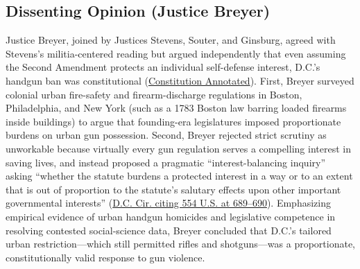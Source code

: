 \documentclass[12pt]{article}
\begin{document}
\subsection{Dissenting Opinion (Justice Breyer)}
Justice Breyer, joined by Justices Stevens, Souter, and Ginsburg, agreed with Stevens's militia-centered reading but argued independently that even assuming the Second Amendment protects an individual self-defense interest, D.C.'s handgun ban was constitutional (\href{https://www.law.cornell.edu/constitution-conan/amendment-2/the-heller-decision-and-individual-right-to-firearms}{Constitution Annotated}). First, Breyer surveyed colonial urban fire-safety and firearm-discharge regulations in Boston, Philadelphia, and New York (such as a 1783 Boston law barring loaded firearms inside buildings) to argue that founding-era legislatures imposed proportionate burdens on urban gun possession. Second, Breyer rejected strict scrutiny as unworkable because virtually every gun regulation serves a compelling interest in saving lives, and instead proposed a pragmatic ``interest-balancing inquiry'' asking ``whether the statute burdens a protected interest in a way or to an extent that is out of proportion to the statute's salutary effects upon other important governmental interests'' (\href{https://www.judiciary.senate.gov/download/heller-v-district-of-columbia_-appendix-and-conclusion}{D.C. Cir. citing 554 U.S. at 689--690}). Emphasizing empirical evidence of urban handgun homicides and legislative competence in resolving contested social-science data, Breyer concluded that D.C.'s tailored urban restriction---which still permitted rifles and shotguns---was a proportionate, constitutionally valid response to gun violence.
\end{document}

